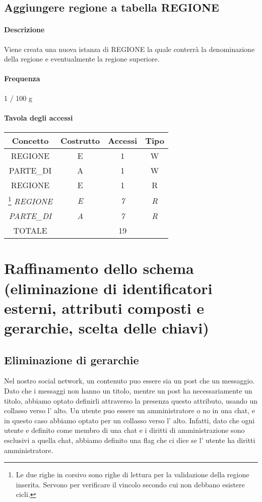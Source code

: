 \documentclass[a4paper,12pt]{report}
\begin{document}
\subsection{Aggiungere regione a tabella REGIONE} \label{aggiungere_regione}
\paragraph{Descrizione} Viene creata una nuova istanza di REGIONE la quale conterrà la denominazione della regione e eventualmente la regione superiore.
\paragraph{Frequenza} 1 / 100 g
\begin{table}[H]
\paragraph{Tavola degli accessi\newline}
\begin{tabular}{|c|c|c|c|}
\hline
Concetto           & Costrutto  & Accessi    & Tipo       \\ \hline
REGIONE            & E          & 1          & W          \\ \hline
PARTE\_DI          & A          & 1          & W          \\ \hline
REGIONE            & E          & 1          & R          \\ \hline
\footnote{Le due righe in corsivo sono righe di lettura per la validazione della regione inserita. Servono per verificare il vincolo secondo cui non debbano esistere cicli.}
\textit{REGIONE}   & \textit{E} & \textit{7} & \textit{R} \\ \hline
\textit{PARTE\_DI} & \textit{A} & \textit{7} & \textit{R} \\ \hline
TOTALE             &            & 19         &            \\ \hline
\end{tabular}
\end{table}
\section{Raffinamento dello schema (eliminazione di identificatori esterni, attributi composti e gerarchie, scelta delle chiavi)}
\subsection{Eliminazione di gerarchie}
Nel nostro social network, un contenuto puo essere sia un 
post che un messaggio. Dato che i messaggi non hanno un titolo, mentre un post ha necessariamente un titolo, 
abbiamo optato definirli attraverso la presenza questo attributo, usando un collasso verso l' alto.
Un utente puo essere un amministratore o no in una chat, e in questo caso abbiamo optato per un collasso verso 
l' alto. Infatti, dato che ogni utente e definito come membro di una chat e i diritti di amministrazione sono esclusivi a 
quella chat, abbiamo definito una flag che ci dice se l' utente ha diritti amministratore.
\end{document}

